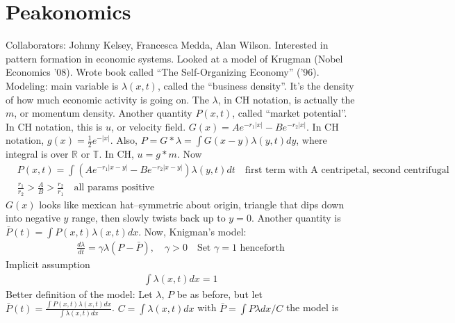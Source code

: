\documentclass[12pt,reqno]{amsart}
\numberwithin{equation}{section}  %
\newcommand{\rr}{\mathbb{R}}
\newcommand{\ci}{\mathbb{T}}
\begin{document}
  \section{Peakonomics} 
  \label{sec:peakonomics}
  Collaborators: Johnny Kelsey, Francesca Medda, Alan Wilson. Interested in
  pattern formation in economic systems. Looked at a model of Krugman (Nobel
  Economics '08). Wrote book called ``The Self-Organizing Economy'' ('96).
  Modeling: main variable is $\lambda (x,t)$, called the ``business density''.
  It's the density of how much economic activity is going on. 
%
%
  The $\lambda$, in CH notation,
  is actually the $m$, or momentum density. Another quantity
  $P(x,t)$, called ``market potential''. In CH notation, this is $u$, or velocity
  field. $G(x) = Ae^{-r_{1} | x |} - Be^{-r_{2}| x |}$. In CH notation,
  $g(x) = \frac{1}{2}e^{-| x |}$. Also, $P = G* \lambda = \int G(x-y) \lambda
  (y,t) dy$, where integral is over $\rr$ or $\ci$. In CH, $u = g*m$.
  Now %
%
  \begin{equation*}
    \begin{split}
      & P(x,t) = \int \left( A e^{-r_{1}| x-y |} - Be^{-r_{2}| x-y |}  \right)
      \lambda(y,t) dt \quad \text{first term with A centripetal, second centrifugal}
      \\
      & \frac{r_{1}}{r_{2}} > \frac{A}{B} > \frac{r_{2}}{r_{1}} \quad \text{all
      params positive}
    \end{split}
  \end{equation*}
%
%
  $G(x)$ looks like mexican hat--symmetric about origin, triangle that dips down
  into negative $y$ range, then slowly twists back up to $y=0$. Another quantity
  is $\bar{P}(t) = \int P(x,t) \lambda(x,t) dx$. Now, Knigman's model:
%
%
  \begin{equation*}
    \begin{split}
      \frac{d \lambda}{dt} = \gamma \lambda (P - \bar{P}), \quad \gamma >0 \quad
      \text{Set $\gamma=1$ henceforth}
    \end{split}
  \end{equation*}
%
%
  Implicit assumption
%
%
  \begin{equation*}
    \begin{split}
      \int \lambda(x,t)dx=1
    \end{split}
  \end{equation*}
%
%
  Better definition of the model: Let $\lambda$, $P$ be as before, but let
  $\bar{P}(t) = \frac{\int P(x,t) \lambda(x,t)dx}{\int \lambda(x,t)dx}$.
  $C = \int \lambda(x,t) dx$ with $\bar{P} = \int P \lambda dx / C$ the model is
\end{document}
